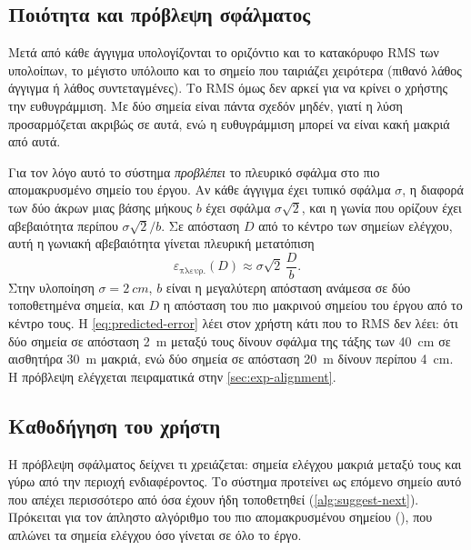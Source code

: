 \subsection{Ποιότητα και πρόβλεψη σφάλματος}

Μετά από κάθε άγγιγμα υπολογίζονται το οριζόντιο και το κατακόρυφο RMS των υπολοίπων, το μέγιστο υπόλοιπο και το σημείο που ταιριάζει χειρότερα (πιθανό λάθος άγγιγμα ή λάθος συντεταγμένες). Το RMS όμως δεν αρκεί για να κρίνει ο χρήστης την ευθυγράμμιση. Με δύο σημεία είναι πάντα σχεδόν μηδέν, γιατί η λύση προσαρμόζεται ακριβώς σε αυτά, ενώ η ευθυγράμμιση μπορεί να είναι κακή μακριά από αυτά.

Για τον λόγο αυτό το σύστημα \emph{προβλέπει} το πλευρικό σφάλμα στο πιο απομακρυσμένο σημείο του έργου. Αν κάθε άγγιγμα έχει τυπικό σφάλμα $\sigma$, η διαφορά των δύο άκρων μιας βάσης μήκους $b$ έχει σφάλμα $\sigma\sqrt{2}$, και η γωνία που ορίζουν έχει αβεβαιότητα περίπου $\sigma\sqrt{2}/b$. Σε απόσταση $D$ από το κέντρο των σημείων ελέγχου, αυτή η γωνιακή αβεβαιότητα γίνεται πλευρική μετατόπιση
\begin{equation}
  \varepsilon_{\text{πλευρ.}}(D) \approx \sigma \sqrt{2}\, \frac{D}{b} .
  \label{eq:predicted-error}
\end{equation}
Στην υλοποίηση $\sigma = \SI{2}{cm}$, $b$ είναι η μεγαλύτερη απόσταση ανάμεσα σε δύο τοποθετημένα σημεία, και $D$ η απόσταση του πιο μακρινού σημείου του έργου από το κέντρο τους. Η \cref{eq:predicted-error} λέει στον χρήστη κάτι που το RMS δεν λέει: ότι δύο σημεία σε απόσταση \SI{2}{m} μεταξύ τους δίνουν σφάλμα της τάξης των \SI{40}{cm} σε αισθητήρα \SI{30}{m} μακριά, ενώ δύο σημεία σε απόσταση \SI{20}{m} δίνουν περίπου \SI{4}{cm}. Η πρόβλεψη ελέγχεται πειραματικά στην \cref{sec:exp-alignment}.


\subsection{Καθοδήγηση του χρήστη}

Η πρόβλεψη σφάλματος δείχνει τι χρειάζεται: σημεία ελέγχου μακριά μεταξύ τους και γύρω από την περιοχή ενδιαφέροντος. Το σύστημα προτείνει ως επόμενο σημείο αυτό που απέχει περισσότερο από όσα έχουν ήδη τοποθετηθεί (\cref{alg:suggest-next}). Πρόκειται για τον άπληστο αλγόριθμο του πιο απομακρυσμένου σημείου (), που απλώνει τα σημεία ελέγχου όσο γίνεται σε όλο το έργο.


